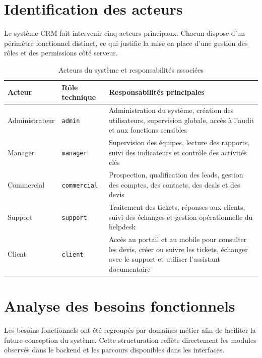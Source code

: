 \section{Identification des acteurs}
Le système CRM fait intervenir cinq acteurs principaux. Chacun dispose d'un périmètre fonctionnel distinct, ce qui justifie la mise en place d'une gestion des rôles et des permissions côté serveur.

\begin{table}[H]
\centering
\caption{Acteurs du système et responsabilités associées}
\label{tab:acteurs}
\begin{tabularx}{\textwidth}{|l|l|X|}
\hline
\textbf{Acteur} & \textbf{Rôle technique} & \textbf{Responsabilités principales} \\
\hline
Administrateur & \texttt{admin} & Administration du système, création des utilisateurs, supervision globale, accès à l'audit et aux fonctions sensibles \\
\hline
Manager & \texttt{manager} & Supervision des équipes, lecture des rapports, suivi des indicateurs et contrôle des activités clés \\
\hline
Commercial & \texttt{commercial} & Prospection, qualification des leads, gestion des comptes, des contacts, des deals et des devis \\
\hline
Support & \texttt{support} & Traitement des tickets, réponses aux clients, suivi des échanges et gestion opérationnelle du helpdesk \\
\hline
Client & \texttt{client} & Accès au portail et au mobile pour consulter les devis, créer ou suivre les tickets, échanger avec le support et utiliser l'assistant documentaire \\
\hline
\end{tabularx}
\end{table}

\section{Analyse des besoins fonctionnels}
Les besoins fonctionnels ont été regroupés par domaines métier afin de faciliter la future conception du système. Cette structuration reflète directement les modules observés dans le backend et les parcours disponibles dans les interfaces.

